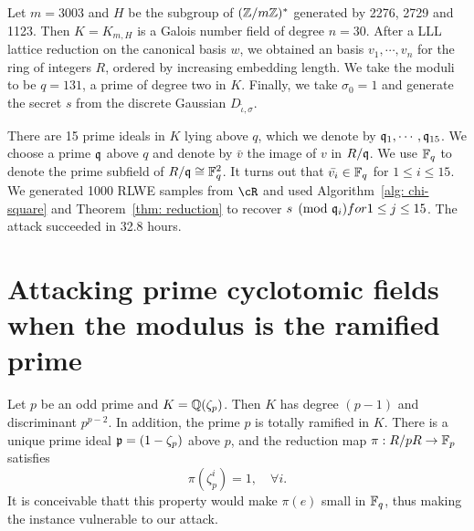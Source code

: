 \documentclass{amsart}
\begin{document}
Let $m = 3003$ and $H$ be the subgroup of $(\mathbb{Z}/m\mathbb{Z})^*$ generated by 2276, 2729 and 1123. Then $K = K_{m,H}$ is a Galois number field of degree $n = 30$. After a LLL lattice reduction on the canonical basis $w$, we obtained an basis $v_1, \cdots, v_n$ for the ring of integers $R$, ordered by increasing embedding length. We take the moduli to be $q = 131$, a prime of degree two in $K$. Finally, we take $\sigma_0 = 1$ and generate the secret $s$ from the discrete Gaussian $D_{\tilde{\iota}, \sigma}$.

There are 15 prime ideals in $K$ lying above $q$, which we denote by $\mathfrak{q}_1, \cdots, \mathfrak{q}_{15}$. We choose a prime $\mathfrak{q}$ above $q$ and denote by $\bar{v}$ the image of $v$ in $R/\mathfrak{q}$. We use $\mathbb{F}_q$ to denote the prime subfield of $R/\mathfrak{q} \cong \mathbb{F}_q^2$. It turns out that $\bar{v_i} \in \mathbb{F}_q$ for $1 \leq i \leq 15$. We generated 1000 RLWE samples from $\cR$ and used Algorithm~\ref{alg: chi-square} and Theorem~\ref{thm: reduction} to recover $s \pmod {\mathfrak{q}_i} for 1 \leq j \leq 15$. The attack succeeded in 32.8 hours.





\section{Attacking prime cyclotomic fields when the modulus is the ramified prime}
\label{sec: ramified-prime}

Let $p$ be an odd prime and $K = \mathbb{Q}(\zeta_p)$. Then $K$ has degree $(p-1)$ and discriminant $p^{p-2}$.
In addition, the prime $p$ is totally ramified in $K$. There is a unique prime ideal $\mathfrak{p} = (1 - \zeta_p)$ above $p$, and the reduction map  $\pi: R/pR \to \mathbb{F}_p$ satisfies
\[
        \pi(\zeta_p^i) = 1, \quad \forall i.
\]
It is conceivable thatt this property would make $\pi(e)$ small in $\mathbb{F}_q$, thus making the instance vulnerable to our attack.



\end{document}
